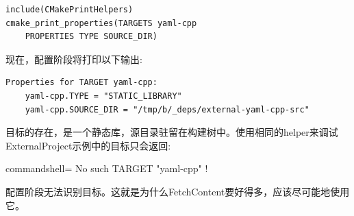 \begin{lstlisting}[style=styleCMake]
include(CMakePrintHelpers)
cmake_print_properties(TARGETS yaml-cpp
	PROPERTIES TYPE SOURCE_DIR)
\end{lstlisting} 

现在，配置阶段将打印以下输出:

\begin{lstlisting}[style=styleCMake]
Properties for TARGET yaml-cpp:
	yaml-cpp.TYPE = "STATIC_LIBRARY"
	yaml-cpp.SOURCE_DIR = "/tmp/b/_deps/external-yaml-cpp-src"
\end{lstlisting} 

目标的存在，是一个静态库，源目录驻留在构建树中。使用相同的helper来调试ExternalProject示例中的目标只会返回:

\begin{tcblisting}{commandshell={}}
No such TARGET "yaml-cpp" !
\end{tcblisting}

配置阶段无法识别目标。这就是为什么FetchContent要好得多，应该尽可能地使用它。




